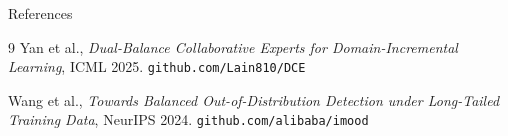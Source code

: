 \documentclass[aspectratio=169,10pt]{beamer}
\begin{document}
\begin{frame}[allowframebreaks]{References}
  \footnotesize
  \begin{thebibliography}{9}
      Yan et al.,
      \textit{Dual-Balance Collaborative Experts for Domain-Incremental Learning},
      ICML 2025. \texttt{github.com/Lain810/DCE}

      Wang et al.,
      \textit{Towards Balanced Out-of-Distribution Detection under Long-Tailed Training Data},
      NeurIPS 2024. \texttt{github.com/alibaba/imood}
  \end{thebibliography}
\end{frame}
\end{document}
